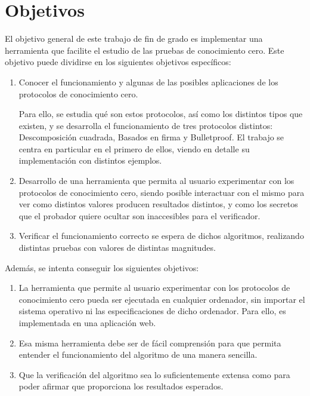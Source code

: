 \section{Objetivos}

El objetivo general de este trabajo de fin de grado es implementar una herramienta que facilite el estudio de las pruebas de conocimiento cero. Este objetivo puede dividirse en los siguientes objetivos específicos:

\begin{enumerate} 
    \item Conocer el funcionamiento y algunas de las posibles aplicaciones de los protocolos de conocimiento cero.

    Para ello, se estudia qué son estos protocolos, así como los distintos tipos que existen, y se desarrolla el funcionamiento de tres protocolos distintos: Descomposición cuadrada, Basados en firma y Bulletproof. El trabajo se centra en particular en el primero de ellos, viendo en detalle su implementación con distintos ejemplos.

    \item Desarrollo de una herramienta que permita al usuario experimentar con los protocolos de conocimiento cero, siendo posible interactuar con el mismo para ver como distintos valores producen resultados distintos, y como los secretos que el probador quiere ocultar son inaccesibles para el verificador.

    \item Verificar el funcionamiento correcto se espera de dichos algoritmos, realizando distintas pruebas con valores de distintas magnitudes.
\end{enumerate}

 Además, se intenta conseguir los siguientes objetivos:
\begin{enumerate}
    \item La herramienta que permite al usuario experimentar con los protocolos de conocimiento cero pueda ser ejecutada en cualquier ordenador, sin importar el sistema operativo ni las especificaciones de dicho ordenador. Para ello, es implementada en una aplicación web.

    \item Esa misma herramienta debe ser de fácil comprensión para que permita entender el funcionamiento del algoritmo de una manera sencilla.

    \item Que la verificación del algoritmo sea lo suficientemente extensa como para poder afirmar que proporciona los resultados esperados.
\end{enumerate}

